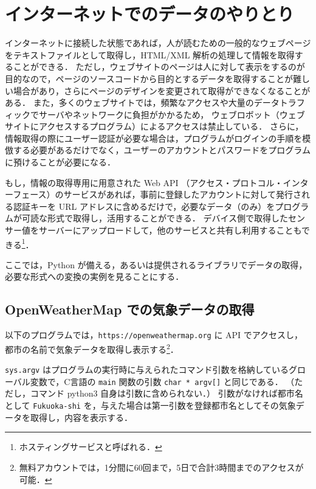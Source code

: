 \documentclass[11pt,a4,epsf]{report}
\begin{document}
\section{インターネットでのデータのやりとり}

インターネットに接続した状態であれば，人が読むための一般的なウェブページをテキストファイルとして取得し，HTML/XML 解析の処理して情報を取得することができる．
ただし，ウェブサイトのページは人に対して表示をするのが目的なので，ページのソースコードから目的とするデータを取得することが難しい場合があり，さらにページのデザインを変更されて取得ができなくなることがある．
また，多くのウェブサイトでは，頻繁なアクセスや大量のデータトラフィックでサーバやネットワークに負担がかかるため，
ウェブロボット（ウェブサイトにアクセスするプログラム）によるアクセスは禁止している．
さらに，情報取得の際にユーザー認証が必要な場合は，プログラムがログインの手順を模倣する必要があるだけでなく，ユーザーのアカウントとパスワードをプログラムに預けることが必要になる．

もし，情報の取得専用に用意された Web API （アクセス・プロトコル・インターフェース）のサービスがあれば，事前に登録したアカウントに対して発行される認証キーを URL アドレスに含めるだけで，必要なデータ（のみ）をプログラムが可読な形式で取得し，活用することができる．
デバイス側で取得したセンサー値をサーバーにアップロードして，他のサービスと共有し利用することもできる\footnote{ホスティングサービスと呼ばれる．}．

ここでは，Python が備える，あるいは提供されるライブラリでデータの取得，必要な形式への変換の実例を見ることにする．

\subsection{OpenWeatherMap での気象データの取得}

以下のプログラムでは，\verb+https://openweathermap.org+ に API でアクセスし，都市の名前で気象データを取得し表示する\footnote{無料アカウントでは，1分間に60回まで，5日で合計3時間までのアクセスが可能．}．

\verb+sys.argv+ はプログラムの実行時に与えられたコマンド引数を格納しているグローバル変数で，C言語の \verb+main+ 関数の引数 \verb+char * argv[]+ と同じである．
（ただし，コマンド python3 自身は引数に含められない．）
引数がなければ都市名として \verb+Fukuoka-shi+ を，与えた場合は第一引数を登録都市名としてその気象データを取得し，内容を表示する．
\end{document}
